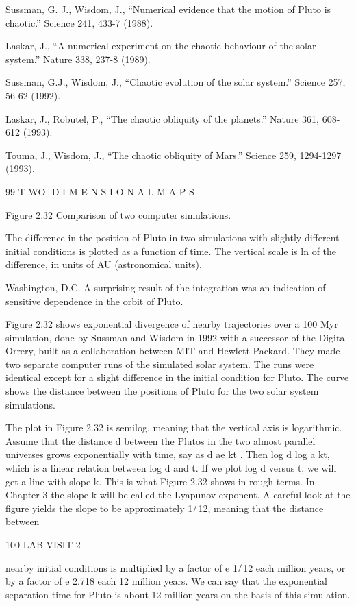 \documentclass[12pt]{article}
\begin{document}
{Sussman, G. J., Wisdom, J., “Numerical evidence that the motion of Pluto is chaotic.” Science 241, 433-7 (1988).

Laskar, J., “A numerical experiment on the chaotic behaviour of the solar system.” Nature 338, 237-8 (1989).

Sussman, G.J., Wisdom, J., “Chaotic evolution of the solar system.” Science 257, 56-62 (1992).

Laskar, J., Robutel, P., “The chaotic obliquity of the planets.” Nature 361, 608-612 (1993).

Touma, J., Wisdom, J., “The chaotic obliquity of Mars.” Science 259, 1294-1297 (1993).

99 T WO -D I M E N S I O N A L M A P S

Figure 2.32 Comparison of two computer simulations.

The difference in the position of Pluto in two simulations with slightly different initial conditions is plotted as a function of 
time. The vertical scale is ln of the difference, in units of AU (astronomical units).

Washington, D.C. A surprising result of the integration was an indication of sensitive dependence in the orbit of Pluto.

Figure 2.32 shows exponential divergence of nearby trajectories over a 100 Myr simulation, done by Sussman and Wisdom in 1992 with a 
successor of the Digital Orrery, built as a collaboration between MIT and Hewlett-Packard. They made two separate computer runs of 
the simulated solar system. The runs were identical except for a slight difference in the initial condition for Pluto. The curve 
shows the distance between the positions of Pluto for the two solar system simulations.

The plot in Figure 2.32 is semilog, meaning that the vertical axis is logarithmic. Assume that the distance d between the Plutos in 
the two almost parallel universes grows exponentially with time, say as d  ae kt . Then log d  log a  kt, which is a linear relation 
between log d and t. If we plot log d versus t, we will get a line with slope k. This is what Figure 2.32 shows in rough terms. In 
Chapter 3 the slope k will be called the Lyapunov exponent. A careful look at the ﬁgure yields the slope to be approximately 1 ̸ 12, 
meaning that the distance between

100 LAB VISIT 2

nearby initial conditions is multiplied by a factor of e 1 ̸ 12 each million years, or by a factor of e  2.718 each 12 million years. 
We can say that the exponential separation time for Pluto is about 12 million years on the basis of this simulation.

}
\end{document}
